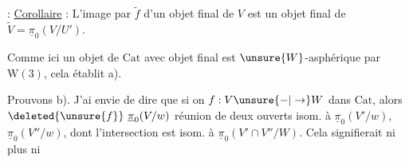  : \uline{Corollaire} : L'image par $\widetilde f$ d'un objet final de $V$ est un objet final de $\widetilde V=\underline{\pi}_0(V/U')$.

Comme ici un objet de $\mathrm{Cat}$ avec objet final est $\unsure{W}$-asphérique par $\mathrm W(3)$, cela établit a).

Prouvons b). J'ai envie de dire que si on  $f:V\unsure{-|\to}W$ dans $\mathrm{Cat}$, alors $\deleted{\unsure{f}}\ \underline{\pi}_0(V/w)$  réunion de deux ouverts isom. à $\underline{\pi}_0(V'/w)$, $\underline{\pi}_0(V''/w)$, dont l'intersection est isom. à $\underline{\pi}_0(V'\cap V''/W)$. Cela signifierait ni plus ni
